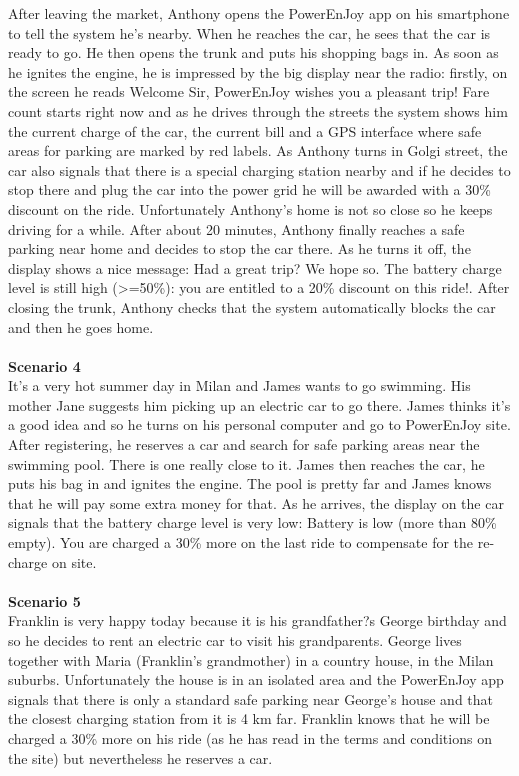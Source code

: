 \documentclass[11pt,a4paper]{report}
\begin{document}
After leaving the market, Anthony opens the PowerEnJoy app on his smartphone to tell the system he's nearby. When he reaches the car, he sees that the car is ready to go. He then opens the trunk and puts his shopping bags in. As soon as he ignites the engine, he is impressed by the big display near the radio: firstly, on the screen he reads Welcome Sir, PowerEnJoy wishes you a pleasant trip! Fare count starts right now and as he drives through the streets the system shows him the current charge of the car, the current bill and a GPS interface where safe areas for parking are marked by red labels. As Anthony turns in Golgi street, the car also signals that there is a special charging station nearby and if he decides to stop there and plug the car into the power grid he will be awarded with a 30\% discount on the ride. Unfortunately Anthony's home is not so close so he keeps driving for a while.
After about 20 minutes, Anthony finally reaches a safe parking near home and decides to stop the car there. As he turns it off, the display shows a nice message: Had a great trip? We hope so. The battery charge level is still high (>=50\%): you are entitled to a 20\% discount on this ride!. After closing the trunk, Anthony checks that the system automatically blocks the car and then he goes home.\\ \noindent \\
\textbf{Scenario 4}\\
It's a very hot summer day in Milan and James wants to go swimming. His mother Jane suggests him picking up an electric car to go there. James thinks it's a good idea and so he turns on his personal computer and go to PowerEnJoy site. After registering, he reserves a car and search for safe parking areas near the swimming pool. There is one really close to it.
James then reaches the car, he puts his bag in and ignites the engine. The pool is pretty far and James knows that he will pay some extra money for that. As he arrives, the display on the car signals that the battery charge level is very low: Battery is low (more than 80\% empty). You are charged a 30\% more on the last ride to compensate for the re-charge on site.\\ 
\noindent \\
\textbf{Scenario 5}\\
Franklin is very happy today because it is his grandfather?s George birthday and so he decides to rent an electric car to visit his grandparents. George lives together with Maria (Franklin's grandmother) in a country house, in the Milan suburbs. Unfortunately the house is in an isolated area and the PowerEnJoy app signals that there is only a standard safe parking near George's house and that the closest charging station from it is 4 km far. Franklin knows that he will be charged a 30\% more on his ride (as he has read in the terms and conditions on the site) but nevertheless he reserves a car.
\end{document}
